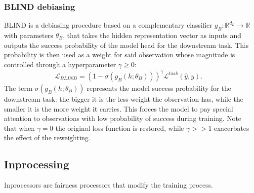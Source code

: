 \documentclass[letterpaper,10pt,english]{sphinxmanual}
\begin{document}
\subsubsection{BLIND debiasing}
\label{\detokenize{algorithms_preprocessors:blind-debiasing}}\label{\detokenize{algorithms_preprocessors:blind}}
\sphinxAtStartPar
BLIND  is a debiasing procedure based on a complementary classifier
\(g_{B} : \mathbb{R}^{d_L} \longrightarrow \mathbb{R}\) with parameters \(\theta_{B}\), that takes the hidden representation vector
as inputs and outputs the success probability of the model head for the downstream task. This probability is then used as a weight for said observation
whose magnitude is controlled through a hyper\sphinxhyphen{}parameter \(\gamma \geq 0\):
\begin{equation*}
\begin{split}\mathcal{L}_{BLIND} = \left(1 - \sigma \left( g_{B}(h; \theta_{B} ) \right) \right)^{\gamma} \mathcal{L}^{task}(\hat{y}, y).\end{split}
\end{equation*}
\sphinxAtStartPar
The term \(\sigma(g_{B}(h;\theta_B))\) represents the model success probability for the downstream task:
the bigger it is the less weight the observation has, while the smaller it is the more weight it carries.
This forces the model to pay special attention to observations with low probability of success during training.
Note that when \(\gamma = 0\) the original loss function is restored, while \(\gamma >> 1\) exacerbates the effect of the reweighting.

\sphinxstepscope


\subsection{In\sphinxhyphen{}processing}
\label{\detokenize{algorithms_inprocessors:in-processing}}\label{\detokenize{algorithms_inprocessors::doc}}
\sphinxAtStartPar
In\sphinxhyphen{}processors are fairness processors that modify the training process.
\end{document}
